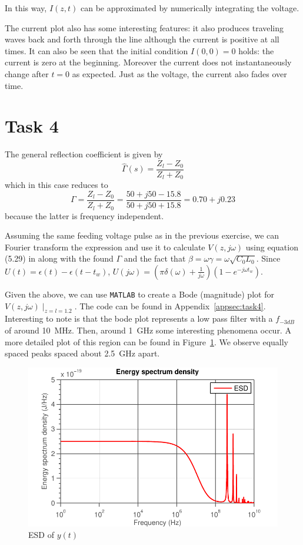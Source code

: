 \documentclass[11pt,titlepage]{report}
\begin{document}
In this way, $I(z,t)$ can be approximated by numerically integrating the voltage. 

The current plot also has some interesting features: it also produces traveling waves back and forth through the line although the current is positive at all times. It can also be seen that the initial condition $I(0,0)=0$ holds: the current is zero at the beginning. Moreover the current does not instantaneously change after $t=0$ as expected. Just as the voltage, the current also fades over time.

\section{Task 4}
The general reflection coefficient is given by 
\begin{equation}
\hat{\Gamma}(s)=\frac{Z_l-Z_0}{Z_l+Z_0}
\end{equation}
which in this case reduces to
\begin{equation}
\Gamma = \frac{Z_l-Z_0}{Z_l+Z_0}=\frac{50+j50-15.8}{50+j50+15.8}=0.70+j0.23
\end{equation}
because the latter is frequency independent.

Assuming the same feeding voltage pulse as in the previous exercise, we can Fourier transform the expression and use it to calculate $V(z,j\omega)$ using equation (5.29) in \cite[63]{epo4-manual} along with the found $\Gamma$ and the fact that $\beta=\omega\gamma=\omega\sqrt{C_0L_0}$. Since $U(t)=\epsilon(t)-\epsilon(t-t_w)$, $U(j\omega)=(\pi\delta(\omega)+\frac{1}{j\omega})(1-e^{-j\omega t_w})$.

Given the above, we can use \texttt{MATLAB} to create a Bode (magnitude) plot for $V(z,j\omega)\mid_{z=l=1.2}$. The code can be found in Appendix~\ref{appsec:task4}.
Interesting to note is that the bode plot represents a low pass filter with a $f_{-3dB}$ of around \SI{10}{\mega\hertz}. Then, around \SI{1}{\giga\hertz} some interesting phenomena occur. A more detailed plot of this region can be found in Figure~\ref{fig:ass1-esd}. We observe equally spaced peaks spaced about \SI{2.5}{\giga\hertz} apart.

\begin{figure}[H]
	\centering
	\includegraphics[width=.85\linewidth]{resource/esd.pdf}
	\caption{ESD of $y(t)$}
	\label{fig:ass1-esd}
\end{figure}
\end{document}
